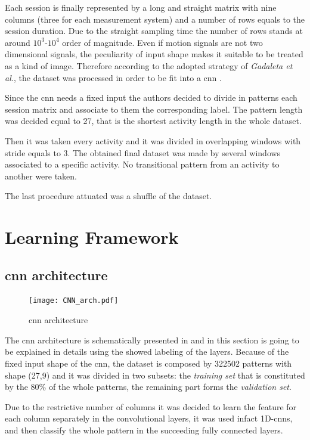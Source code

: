 Each session is finally represented by a long and straight matrix with nine columns (three for each measurement system) and a number of rows equals to the session duration. Due to the straight sampling time the number of rows stands at around $10^3$-$10^4$ order of magnitude. Even if motion signals are not two dimensional signals, the peculiarity of input shape makes it suitable to be treated as a kind of image. Therefore according to the adopted strategy of \textit{Gadaleta et al.}, the dataset was processed in order to be fit into a \gls{cnn} \cite{Gadaleta-2018}.


Since the \gls{cnn} needs a fixed input the authors decided to divide in patterns each session matrix and associate to them the corresponding label. The pattern length was decided equal to 27, that is the shortest activity length in the whole dataset. 

Then it was taken every activity and it was divided in overlapping windows with stride equals to 3. The obtained final dataset was made by several windows associated to a specific activity. No transitional pattern from an activity to another were taken. 


The last procedure attuated was a shuffle of the dataset.


\section{Learning Framework}
\label{sec:learning_framework}

\subsection{\gls{cnn} architecture}

\begin{figure}[htp]
\texttt{[image: CNN\_arch.pdf]}
\caption{\gls{cnn} architecture}
\label{fig:CNN}
\end{figure}

The \gls{cnn} architecture is schematically presented in  and in this section is going to be explained in details using the showed labeling of the layers. 
Because of the fixed input shape of the \gls{cnn}, the dataset is composed by 322502 patterns with shape (27,9) and it was divided in two subsets: the \textit{training set} that is constituted by the 80\% of the whole patterns, the remaining part forms the \textit{validation set}.

Due to the restrictive number of columns it was decided to learn the feature for each column separately in the convolutional layers, it was used infact 1D-\glspl{cnn}, and then classify the whole pattern in the succeeding fully connected layers. 

